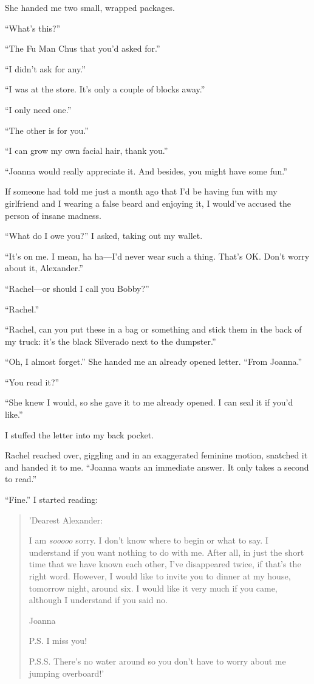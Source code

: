 She handed me two small, wrapped packages.

``What's this?''

``The Fu Man Chus that you'd asked for.''

``I didn't ask for any.''

``I was at the store. It's only a couple of blocks away.''

``I only need one.''

``The other is for you.''

``I can grow my own facial hair, thank you.''

``Joanna would really appreciate it. And besides, you might have some
fun.''

If someone had told me just a month ago that I'd be having fun with my
girlfriend and I wearing a false beard and enjoying it, I would've
accused the person of insane madness.

``What do I owe you?'' I asked, taking out my wallet.

``It's on me. I mean, ha ha---I'd never wear such a thing. That's OK.
Don't worry about it, Alexander.''

``Rachel---or should I call you Bobby?''

``Rachel.''

``Rachel, can you put these in a bag or something and stick them in the
back of my truck: it's the black Silverado next to the dumpster.''

``Oh, I almost forget.'' She handed me an already opened letter. ``From
Joanna.''

``You read it?''

``She knew I would, so she gave it to me already opened. I can seal it
if you'd like.''

I stuffed the letter into my back pocket.

Rachel reached over, giggling and in an exaggerated feminine motion,
snatched it and handed it to me. ``Joanna wants an immediate answer. It
only takes a second to read.''

``Fine.'' I started reading:

\begin{quote}
'Dearest Alexander:

I am \emph{sooooo} sorry. I don't know where to begin or what to say. I
understand if you want nothing to do with me. After all, in just the
short time that we have known each other, I've disappeared twice, if
that's the right word. However, I would like to invite you to dinner at
my house, tomorrow night, around six. I would like it very much if you
came, although I understand if you said no.

Joanna

P.S. I miss you!

P.S.S. There's no water around so you don't have to worry about me
jumping overboard!'
\end{quote}

